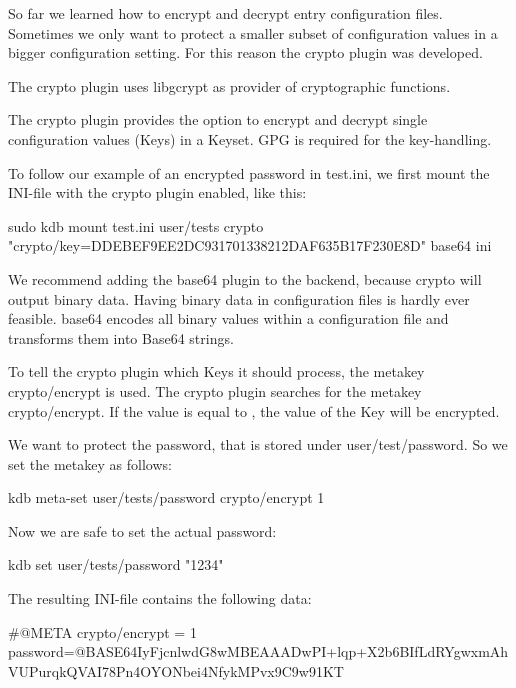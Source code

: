So far we learned how to encrypt and decrypt entry configuration files. Sometimes we only want to protect a smaller subset of configuration values in a bigger configuration setting. For this reason the {\ttfamily crypto} plugin was developed.

The {\ttfamily crypto} plugin uses {\ttfamily libgcrypt} as provider of cryptographic functions.

The {\ttfamily crypto} plugin provides the option to encrypt and decrypt single configuration values (Keys) in a Keyset. G\+PG is required for the key-\/handling.

To follow our example of an encrypted password in {\ttfamily test.\+ini}, we first mount the I\+N\+I-\/file with the {\ttfamily crypto} plugin enabled, like this\+:


\begin{DoxyCode}
sudo kdb mount test.ini user/tests crypto "crypto/key=DDEBEF9EE2DC931701338212DAF635B17F230E8D" base64 ini
\end{DoxyCode}


We recommend adding the {\ttfamily base64} plugin to the backend, because {\ttfamily crypto} will output binary data. Having binary data in configuration files is hardly ever feasible. {\ttfamily base64} encodes all binary values within a configuration file and transforms them into Base64 strings.

To tell the {\ttfamily crypto} plugin which Keys it should process, the metakey {\ttfamily crypto/encrypt} is used. The {\ttfamily crypto} plugin searches for the metakey {\ttfamily crypto/encrypt}. If the value is equal to {}, the value of the Key will be encrypted.

We want to protect the password, that is stored under {\ttfamily user/test/password}. So we set the metakey as follows\+:


\begin{DoxyCode}
kdb meta-set user/tests/password crypto/encrypt 1
\end{DoxyCode}


Now we are safe to set the actual password\+:


\begin{DoxyCode}
kdb set user/tests/password "1234"
\end{DoxyCode}


The resulting I\+N\+I-\/file contains the following data\+:


\begin{DoxyCode}
#@META crypto/encrypt = 1
password=@BASE64IyFjcnlwdG8wMBEAAADwPI+lqp+X2b6BIfLdRYgwxmAhVUPurqkQVAI78Pn4OYONbei4NfykMPvx9C9w91KT
\end{DoxyCode}


